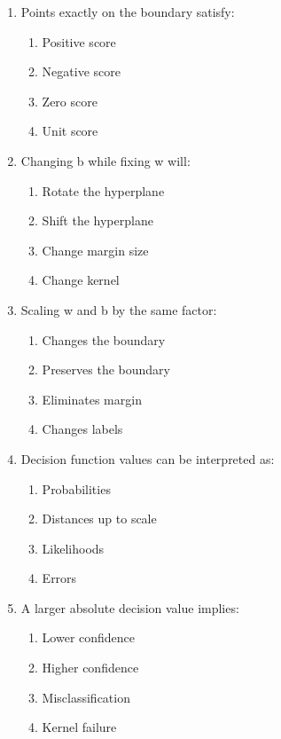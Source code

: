 \documentclass{article}
\begin{document}
\begin{enumerate}
		\item Points exactly on the boundary satisfy:
		\begin{enumerate}
			\item Positive score
			\item Negative score
			\item Zero score
			\item Unit score
		\end{enumerate}
		
		\item Changing b while fixing w will:
		\begin{enumerate}
			\item Rotate the hyperplane
			\item Shift the hyperplane
			\item Change margin size
			\item Change kernel
		\end{enumerate}
		
		\item Scaling w and b by the same factor:
		\begin{enumerate}
			\item Changes the boundary
			\item Preserves the boundary
			\item Eliminates margin
			\item Changes labels
		\end{enumerate}
		
		\item Decision function values can be interpreted as:
		\begin{enumerate}
			\item Probabilities
			\item Distances up to scale
			\item Likelihoods
			\item Errors
		\end{enumerate}
		
		\item A larger absolute decision value implies:
		\begin{enumerate}
			\item Lower confidence
			\item Higher confidence
			\item Misclassification
			\item Kernel failure
		\end{enumerate}
	\end{enumerate}
	
\end{document}
